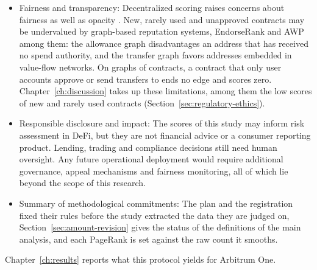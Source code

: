 \begin{itemize}
\item{}\label{sub:fairness-transparency}
  Fairness and transparency: Decentralized scoring raises concerns about fairness as well as opacity \parencite{packin2024credit}. New, rarely used and unapproved contracts may be undervalued by graph-based reputation systems, EndorseRank and AWP among them: the allowance graph disadvantages an address that has received no spend authority, and the transfer graph favors addresses embedded in value-flow networks. On graphs of contracts, a contract that only user accounts approve or send transfers to ends no edge and scores zero. Chapter~\ref{ch:discussion} takes up these limitations, among them the low scores of new and rarely used contracts (Section~\ref{sec:regulatory-ethics}).


\item{}\label{sub:responsible-disclosure}
  Responsible disclosure and impact: The scores of this study may inform risk assessment in DeFi, but they are not financial advice or a consumer reporting product. Lending, trading and compliance decisions still need human oversight. Any future operational deployment would require additional governance, appeal mechanisms and fairness monitoring, all of which lie beyond the scope of this research.


\item{}\label{sub:methodological-commitments}
  Summary of methodological commitments: The plan and the registration fixed their rules before the study extracted the data they are judged on, Section~\ref{sec:amount-revision} gives the status of the definitions of the main analysis, and each PageRank is set against the raw count it smooths.
\end{itemize}

Chapter~\ref{ch:results} reports what this protocol yields for Arbitrum One.
